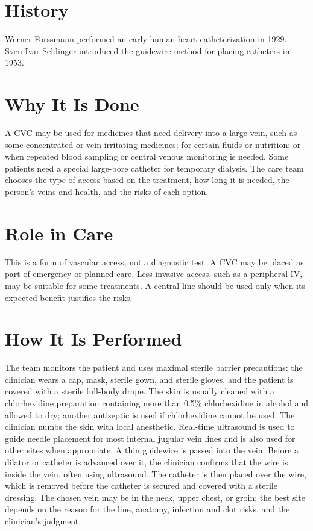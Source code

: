 \section*{History}
Werner Forssmann performed an early human heart catheterization in 1929. Sven-Ivar Seldinger introduced the guidewire method for placing catheters in 1953.

\section*{Why It Is Done}
A CVC may be used for medicines that need delivery into a large vein, such as some concentrated or vein-irritating medicines; for certain fluids or nutrition; or when repeated blood sampling or central venous monitoring is needed. Some patients need a special large-bore catheter for temporary dialysis. The care team chooses the type of access based on the treatment, how long it is needed, the person's veins and health, and the risks of each option.

\section*{Role in Care}
This is a form of vascular access, not a diagnostic test. A CVC may be placed as part of emergency or planned care. Less invasive access, such as a peripheral IV, may be suitable for some treatments. A central line should be used only when its expected benefit justifies the risks.

\section*{How It Is Performed}
The team monitors the patient and uses maximal sterile barrier precautions: the clinician wears a cap, mask, sterile gown, and sterile gloves, and the patient is covered with a sterile full-body drape. The skin is usually cleaned with a chlorhexidine preparation containing more than 0.5\% chlorhexidine in alcohol and allowed to dry; another antiseptic is used if chlorhexidine cannot be used. The clinician numbs the skin with local anesthetic. Real-time ultrasound is used to guide needle placement for most internal jugular vein lines and is also used for other sites when appropriate. A thin guidewire is passed into the vein. Before a dilator or catheter is advanced over it, the clinician confirms that the wire is inside the vein, often using ultrasound. The catheter is then placed over the wire, which is removed before the catheter is secured and covered with a sterile dressing. The chosen vein may be in the neck, upper chest, or groin; the best site depends on the reason for the line, anatomy, infection and clot risks, and the clinician's judgment.

